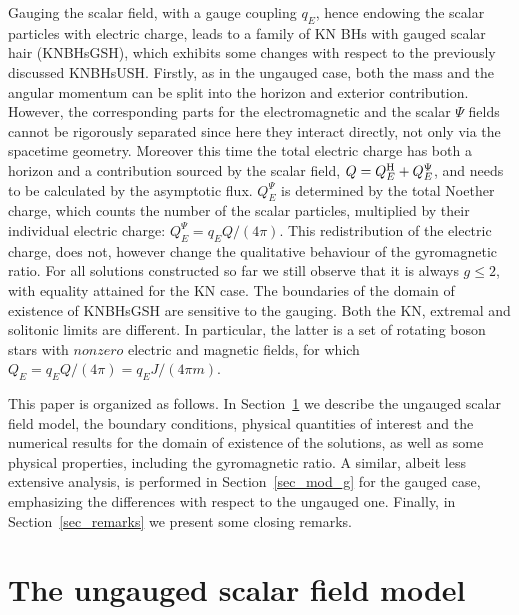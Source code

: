 Gauging the scalar field, with a gauge coupling $q_E$, hence endowing the scalar particles with electric charge, leads to a family of KN BHs with gauged scalar hair (KNBHsGSH), which exhibits some changes with respect to the previously discussed KNBHsUSH. 
%
Firstly, as in the ungauged case,
both the mass and the angular momentum can be split  into the horizon and exterior contribution.
However, the corresponding parts for the electromagnetic and  the scalar $\Psi$ fields cannot be rigorously
separated since  here they interact directly, not only via the spacetime geometry.
Moreover this time  
the total electric charge has both a horizon and a contribution sourced by the scalar field,  $Q=Q^{\rm H}_E+Q^\Psi_E$,  
and needs to be calculated by the asymptotic flux.
$Q_E^\Psi$ is determined by the total Noether charge, which counts the number of the scalar particles, multiplied by their individual electric charge:  $Q_E^\Psi=q_E Q/(4 \pi)$. 
This redistribution of the electric charge, does not, however change the qualitative behaviour of the gyromagnetic ratio. 
For all solutions constructed so far we still observe that it is always $g\leqslant 2$, with equality attained for the KN case. 
The boundaries of the domain of existence of KNBHsGSH are sensitive to the gauging. 
Both the KN, extremal and solitonic limits are different. 
In particular, the latter is a set of rotating  boson stars with  $nonzero$ electric 
and magnetic fields, for which  $Q_E= q_E Q/(4\pi)= q_E J/(4 \pi m)$.  

 
\bigskip

This paper is organized as follows. In Section~\ref{sec_mod_u} we describe the ungauged scalar field model, the boundary conditions, physical quantities of interest and the numerical results for the domain of existence of the solutions, as well as some physical properties, including the gyromagnetic ratio. A similar, albeit less extensive analysis, is performed in Section~\ref{sec_mod_g} for the gauged case, emphasizing the differences with respect to the ungauged one. Finally, in Section~\ref{sec_remarks} we present some closing remarks.



\section{The ungauged scalar field model}
\label{sec_mod_u}


